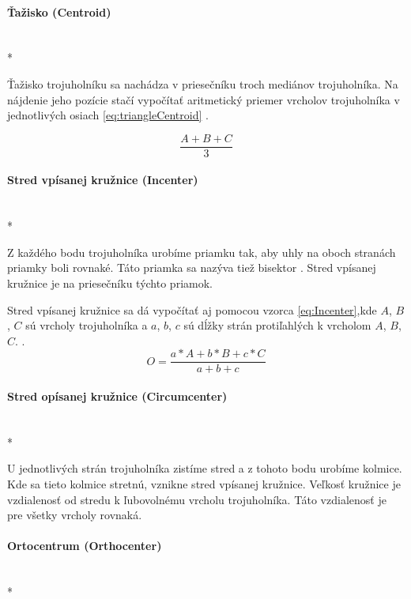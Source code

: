 \paragraph{Ťažisko (Centroid)}\unskip \mbox{} \\*

Ťažisko trojuholníku sa nachádza v priesečníku troch mediánov trojuholníka. Na nájdenie jeho pozície stačí vypočítať aritmetický priemer vrcholov trojuholníka v jednotlivých osiach \ref{eq:triangleCentroid} \cite{Centroid_of_a_Triangle}.



\begin{equation}
    \frac{A+B+C}{3}
    \label{eq:triangleCentroid}
\end{equation}

\paragraph{Stred vpísanej kružnice (Incenter)}\unskip \mbox{} \\*
\label{sec:TriangleCenter}

Z každého bodu trojuholníka urobíme priamku tak, aby uhly na oboch stranách priam\-ky boli rovnaké. Táto priamka sa nazýva tiež bisektor \cite{https://www.tutorvista.com/math/angle-bisector-theorem}. Stred vpísanej kružnice je na priesečníku týchto priamok.




Stred vpísanej kružnice sa dá vypočítať aj pomocou vzorca \ref{eq:Incenter},kde  $A$, $B$, $C$ sú vrcholy trojuholníka a $a$, $b$, $c$ sú dĺžky strán protiľahlých k vrcholom $A$, $B$, $C$. \cite{Incenter_page_2011}.
\begin{equation}
O = \frac{a\ast A+b\ast  B +c \ast C}{a + b + c}
    \label{eq:Incenter}
\end{equation}


\paragraph{Stred opísanej kružnice (Circumcenter)}\unskip \mbox{} \\*

U jednotlivých strán trojuholníka zistíme stred a z tohoto bodu urobíme kolmice. Kde sa tieto kolmice stretnú, vznikne stred vpísanej kružnice. Veľkosť kružnice je vzdialenosť od stredu k ľubovolnému vrcholu trojuholníka. Táto vzdialenosť je pre všetky vrcholy rovnaká.


\paragraph{Ortocentrum (Orthocenter)}\unskip \mbox{} \\*

